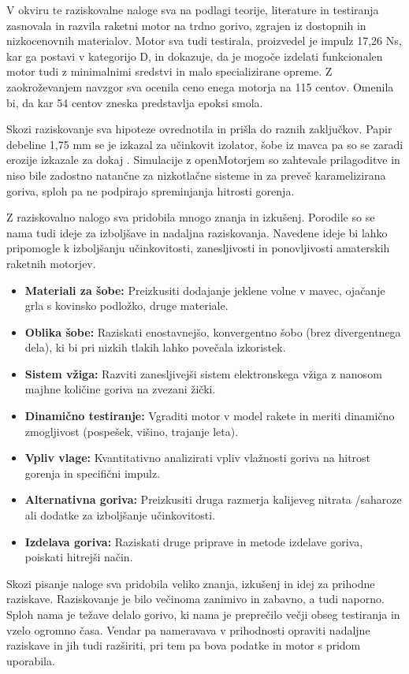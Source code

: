 \documentclass[titlepage, a4paper, twoside, final, 12pt]{article}
\begin{document}
V okviru te raziskovalne naloge sva na podlagi teorije, literature in testiranja zasnovala in razvila raketni motor na trdno gorivo, zgrajen iz dostopnih in nizkocenovnih materialov. Motor sva tudi testirala, proizvedel je impulz 17,26 Ns, kar ga postavi v kategorijo D, in dokazuje, 
da je mogoče izdelati funkcionalen motor tudi z  minimalnimi sredstvi in malo specializirane opreme. Z zaokroževanjem navzgor sva ocenila ceno enega motorja na 115 centov. Omenila bi, da kar 54 centov zneska predstavlja epoksi smola.

Skozi raziskovanje sva hipoteze ovrednotila in prišla do raznih zaključkov. Papir debeline 1,75 mm se je izkazal za učinkovit izolator, šobe iz mavca pa so se zaradi erozije izkazale za dokaj  	.
Simulacije z openMotorjem so zahtevale prilagoditve in niso bile zadostno natančne za nizkotlačne sisteme in za preveč karamelizirana goriva, sploh pa ne podpirajo spreminjanja hitrosti gorenja.

Z raziskovalno nalogo sva pridobila mnogo znanja in izkušenj. Porodile so se nama tudi ideje za izboljšave in nadaljna raziskovanja.
Navedene ideje bi lahko pripomogle k izboljšanju učinkovitosti, zanesljivosti in ponovljivosti amaterskih raketnih motorjev. 

\begin{itemize}
	\item \textbf{Materiali za šobe:} Preizkusiti dodajanje jeklene volne v mavec, ojačanje grla s kovinsko podložko, druge materiale.
	\item \textbf{Oblika šobe:} Raziskati enostavnejšo, konvergentno šobo (brez divergentnega dela), ki bi pri nizkih tlakih lahko povečala izkoristek.
	\item \textbf{Sistem vžiga:} Razviti zanesljivejši sistem elektronskega vžiga z nanosom majhne količine goriva na zvezani žički.
	\item \textbf{Dinamično testiranje:} Vgraditi motor v model rakete in meriti dinamično zmogljivost (pospešek, višino, trajanje leta).
	\item \textbf{Vpliv vlage:} Kvantitativno analizirati vpliv vlažnosti goriva na hitrost gorenja in specifični impulz.
	\item \textbf{Alternativna goriva:} Preizkusiti druga razmerja kalijeveg nitrata /saharoze ali dodatke za izboljšanje učinkovitosti.
	\item \textbf{Izdelava goriva:} Raziskati druge priprave in metode izdelave goriva, poiskati hitrejši način.
\end{itemize}

		Skozi pisanje naloge sva pridobila veliko znanja, izkušenj in idej za prihodne raziskave. Raziskovanje je bilo večinoma zanimivo in zabavno, a tudi naporno.
		Sploh nama je težave delalo gorivo, ki nama je preprečilo večji obseg testiranja in vzelo ogromno časa.
		Vendar pa nameravava v prihodnosti opraviti nadaljne raziskave in jih tudi razširiti, pri tem pa bova podatke in motor s pridom uporabila.

	\printbibliography
	[
	heading=bibintoc,
	title={Literatura}
	]
\end{document}
